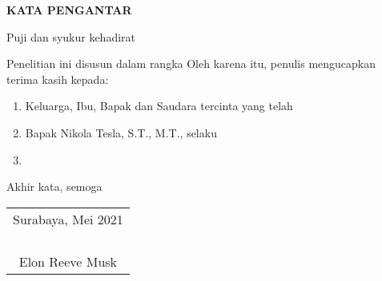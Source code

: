 \begin{center}
  \Large\textbf{KATA PENGANTAR}
\end{center}

\vspace{2ex}


Puji dan syukur kehadirat \lipsum[1][1-5]

Penelitian ini disusun dalam rangka \lipsum[2][1-5]
Oleh karena itu, penulis mengucapkan terima kasih kepada:

\begin{enumerate}[nolistsep]

  \item Keluarga, Ibu, Bapak dan Saudara tercinta yang telah \lipsum[3][1-2]

  \item Bapak Nikola Tesla, S.T., M.T., selaku \lipsum[3][3-4]

  \item \lipsum[3][5-7]

\end{enumerate}

Akhir kata, semoga \lipsum[4][1-8]

\begin{flushright}
  \begin{tabular}[b]{c}
    Surabaya, Mei 2021\\
    \\
    \\
    \\
    \\
    Elon Reeve Musk
  \end{tabular}
\end{flushright}
